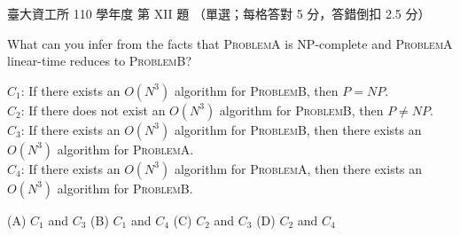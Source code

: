 \begin{pastexam}[label={px:ntu-110-dsaa-12}]{臺大資工所 110 學年度 第 XII 題}
（單選；每格答對 5 分，答錯倒扣 2.5 分）

What can you infer from the facts that \textsc{ProblemA} is NP-complete and \textsc{ProblemA}
linear-time reduces to \textsc{ProblemB}? \underline{}

$C_1$: If there exists an $O(N^3)$ algorithm for \textsc{ProblemB}, then $P=NP$.\\
$C_2$: If there does not exist an $O(N^3)$ algorithm for \textsc{ProblemB}, then $P\neq NP$.\\
$C_3$: If there exists an $O(N^3)$ algorithm for \textsc{ProblemB}, then there exists an
$O(N^3)$ algorithm for \textsc{ProblemA}.\\
$C_4$: If there exists an $O(N^3)$ algorithm for \textsc{ProblemA}, then there exists an
$O(N^3)$ algorithm for \textsc{ProblemB}.

(A) $C_1$ and $C_3$ \qquad (B) $C_1$ and $C_4$ \qquad (C) $C_2$ and $C_3$ \qquad (D) $C_2$ and $C_4$
\end{pastexam}

